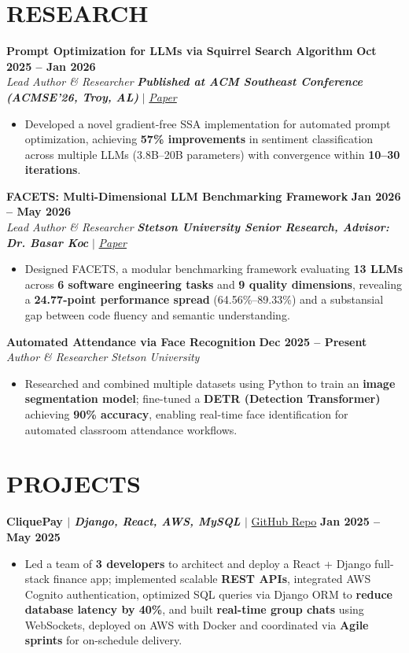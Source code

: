 \documentclass[letterpaper,10pt]{article}
\begin{document}
\section*{RESEARCH}
\textbf{Prompt Optimization for LLMs via Squirrel Search Algorithm} \hfill \textbf{Oct 2025 -- Jan 2026} \\
\textit{Lead Author \& Researcher} \hfill \textbf{\textit{Published at ACM Southeast Conference (ACMSE'26, Troy, AL)}} $|$ \href{https://doi.org/10.1145/3746467.3801519}{\textit{Paper}}
\begin{itemize}[itemsep=-2pt]
\item Developed a novel gradient-free SSA implementation for automated prompt optimization, achieving \textbf{57\% improvements} in sentiment classification across multiple LLMs (3.8B--20B parameters) with convergence within \textbf{10--30 iterations}.
\end{itemize}
\textbf{FACETS: Multi-Dimensional LLM Benchmarking Framework} \hfill \textbf{Jan 2026 -- May 2026}\\
\textit{Lead Author \& Researcher} \hfill \textbf{\textit{Stetson University Senior Research, Advisor: Dr. Basar Koc}} $|$ \href{https://yashbpatel.vercel.app/assets/facets_paper-Bnfz5TxH.pdf}{\textit{Paper}}
\begin{itemize}[itemsep=-2pt]
\item Designed FACETS, a modular benchmarking framework evaluating \textbf{13 LLMs} across \textbf{6 software engineering tasks} and \textbf{9 quality dimensions}, revealing a \textbf{24.77-point performance spread} (64.56\%--89.33\%) and a substansial gap between code fluency and semantic understanding.
\end{itemize}
\textbf{Automated Attendance via Face Recognition} \hfill \textbf{Dec 2025 -- Present} \\
\textit{Author \& Researcher} \hfill \textit{Stetson University}
\begin{itemize}[itemsep=-2pt]
\item Researched and combined multiple datasets using Python to train an \textbf{image segmentation model}; fine-tuned a \textbf{DETR (Detection Transformer)} achieving \textbf{90\% accuracy}, enabling real-time face identification for automated classroom attendance workflows.
\end{itemize}
\section*{PROJECTS}
\textbf{CliquePay $|$ \textit{Django, React, AWS, MySQL} $|$} \href{https://github.com/CSCI-321-Project/CliquePay}{GitHub Repo} \hfill \textbf{Jan 2025 -- May 2025}
\begin{itemize}[itemsep=-2pt]
    \item Led a team of \textbf{3 developers} to architect and deploy a React + Django full-stack finance app; implemented scalable \textbf{REST APIs}, integrated AWS Cognito authentication, optimized SQL queries via Django ORM to \textbf{reduce database latency by 40\%}, and built \textbf{real-time group chats} using WebSockets, deployed on AWS with Docker and coordinated via \textbf{Agile sprints} for on-schedule delivery.
\end{itemize}
\end{document}
